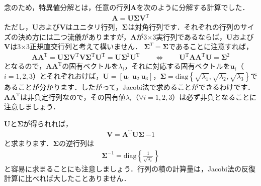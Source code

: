 ﻿\documentclass[a4paper]{jsarticle}
\begin{document}
念のため，特異値分解とは，任意の行列$\boldsymbol{A}$を次のように分解する計算でした．
\begin{align*}
\boldsymbol{A}=\boldsymbol{U}\boldsymbol{\Sigma}\boldsymbol{V}^{\mathrm{T}}
\end{align*}
ただし，$\boldsymbol{U}$および$\boldsymbol{V}$はユニタリ行列，$\boldsymbol{\Sigma}$は対角行列です．それぞれの行列のサイズの決め方には二つ流儀がありますが，$\boldsymbol{A}$が3×3実行列であるならば，$\boldsymbol{U}$および$\boldsymbol{V}$は3×3正規直交行列と考えて構いません．
$\boldsymbol{\Sigma}^{T}=\boldsymbol{\Sigma}$であることに注意すれば，
\begin{align*}
\boldsymbol{A}\boldsymbol{A}^{\mathrm{T}}
=\boldsymbol{U}\boldsymbol{\Sigma}\boldsymbol{V}^{\mathrm{T}}\boldsymbol{V}\boldsymbol{\Sigma}^{\mathrm{T}}\boldsymbol{U}^{\mathrm{T}}
=\boldsymbol{U}\boldsymbol{\Sigma}^{2}\boldsymbol{U}^{\mathrm{T}}
\qquad\Leftrightarrow\qquad
\boldsymbol{U}^{\mathrm{T}}\boldsymbol{A}\boldsymbol{A}^{\mathrm{T}}\boldsymbol{U}=\boldsymbol{\Sigma}^{2}
\end{align*}
となるので，$\boldsymbol{A}\boldsymbol{A}^{\mathrm{T}}$の固有ベクトルを$\lambda_{i}$，それに対応する固有ベクトルを$\boldsymbol{u}_{i}$（$i=1,2,3$）とそれぞれおけば，$\boldsymbol{U}=[\boldsymbol{u}_{1}~\boldsymbol{u}_{2}~\boldsymbol{u}_{3}]$，$\boldsymbol{\Sigma}=\mathrm{diag}\left\{\sqrt{\lambda_{1}},\sqrt{\lambda_{2}},\sqrt{\lambda_{3}}\right\}$であることが分かります．したがって，Jacobi法で求めることができるわけです．
$\boldsymbol{A}\boldsymbol{A}^{\mathrm{T}}$は非負定行列なので，その固有値$\lambda_{i}$（$\forall i=1,2,3$）は必ず非負となることに注意しましょう．

$\boldsymbol{U}$と$\boldsymbol{\Sigma}$が得られれば，
\begin{align*}
\boldsymbol{V}=\boldsymbol{A}^{\mathrm{T}}\boldsymbol{U}\boldsymbol{\Sigma}~{-1}
\end{align*}
と求まります．$\boldsymbol{\Sigma}$の逆行列は
\begin{align*}
\boldsymbol{\Sigma}^{-1}=\mathrm{diag}\left\{\frac{1}{\sqrt{\lambda_{i}}}\right\}
\end{align*}
と容易に求まることにも注意しましょう．行列の積の計算量は，Jacobi法の反復計算に比べれば大したことありません．
\end{document}
